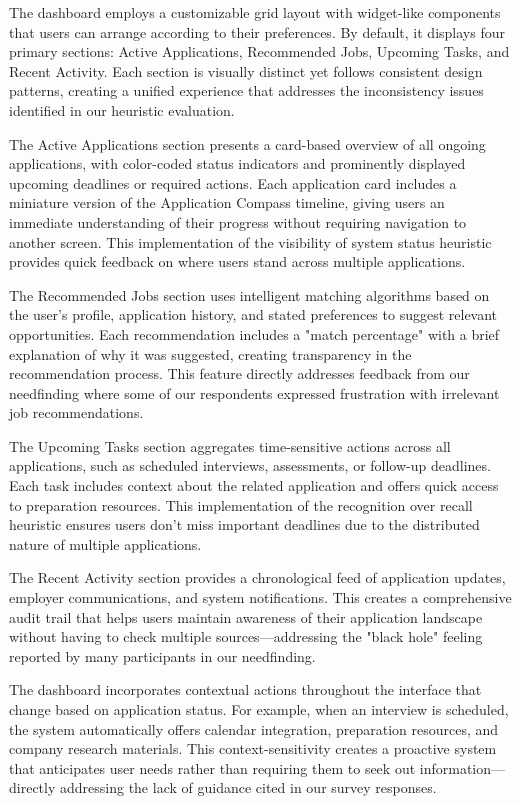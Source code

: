 \documentclass[
	letterpaper, %
]{jdf}
\begin{document}
\begin{sloppypar}
The dashboard employs a customizable grid layout with widget-like components that users can arrange according to their preferences. By default, it displays four primary sections: Active Applications, Recommended Jobs, Upcoming Tasks, and Recent Activity. Each section is visually distinct yet follows consistent design patterns, creating a unified experience that addresses the inconsistency issues identified in our heuristic evaluation.

The Active Applications section presents a card-based overview of all ongoing applications, with color-coded status indicators and prominently displayed upcoming deadlines or required actions. Each application card includes a miniature version of the Application Compass timeline, giving users an immediate understanding of their progress without requiring navigation to another screen. This implementation of the visibility of system status heuristic provides quick feedback on where users stand across multiple applications.

The Recommended Jobs section uses intelligent matching algorithms based on the user's profile, application history, and stated preferences to suggest relevant opportunities. Each recommendation includes a "match percentage" with a brief explanation of why it was suggested, creating transparency in the recommendation process. This feature directly addresses feedback from our needfinding where some of our respondents expressed frustration with irrelevant job recommendations.

The Upcoming Tasks section aggregates time-sensitive actions across all applications, such as scheduled interviews, assessments, or follow-up deadlines. Each task includes context about the related application and offers quick access to preparation resources. This implementation of the recognition over recall heuristic ensures users don't miss important deadlines due to the distributed nature of multiple applications.

The Recent Activity section provides a chronological feed of application updates, employer communications, and system notifications. This creates a comprehensive audit trail that helps users maintain awareness of their application landscape without having to check multiple sources—addressing the "black hole" feeling reported by many participants in our needfinding.

The dashboard incorporates contextual actions throughout the interface that change based on application status. For example, when an interview is scheduled, the system automatically offers calendar integration, preparation resources, and company research materials. This context-sensitivity creates a proactive system that anticipates user needs rather than requiring them to seek out information—directly addressing the lack of guidance cited in our survey responses.


\end{sloppypar}
\end{document}
